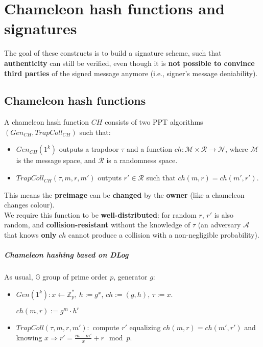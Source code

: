 \documentclass[oneside]{book}
\newcommand{\Z}[0]{\mathbb{Z}}
\newcommand{\G}[0]{\mathbb{G}}
\newcommand{\cA}[0]{\mathcal{A}}
\begin{document}
\chapter{Chameleon hash functions and signatures}
The goal of these constructs is to build a signature scheme, such that \textbf{authenticity} can still be verified, even though it is \textbf{not possible to convince third parties} of the signed message anymore (i.e., signer's message deniability).

\section{Chameleon hash functions}
A chameleon hash function $CH$ consists of two PPT algorithms $(Gen_{CH}, TrapColl_{CH})$ such that:
\begin{itemize}
    \item $Gen_{CH}(1^k)$ outputs a trapdoor $\tau$ and a function $ch: \mathcal{M} \times \mathcal{R} \rightarrow \mathcal{N}$, where $\mathcal{M}$ is the message space, and $\mathcal{R}$ is a randomness space.
    
    \item $TrapColl_{CH}(\tau, m, r, m')$ outputs $r' \in \mathcal{R}$ such that $ch(m,r) = ch(m',r')$.
\end{itemize}

This means the \textbf{preimage} can be \textbf{changed} by the \textbf{owner} (like a chameleon changes colour).\\

We require this function to be \textbf{well-distributed}: for random $r$, $r'$ is also random, and \textbf{collision-resistant} without the knowledge of $\tau$ (an adversary $\cA$ that knows \textbf{only} $ch$ cannot produce a collision with a non-negligible probability).

\paragraph{Chameleon hashing based on DLog}
As usual, $\G$ group of prime order $p$, generator $g$:
\begin{itemize}
    \item $Gen(1^k): x \leftarrow \Z_p^*$, $h := g^x$, $ch := (g,h)$, $\tau := x$.
    
    $ch(m,r) := g^m \cdot h^r$
    
    \item $TrapColl(\tau, m, r, m'): $ compute $r'$ equalizing $ch(m,r) = ch(m',r')$ and knowing $x \Rightarrow r' = \frac{m-m'}{x} + r \mod p$.
\end{itemize}
\end{document}
